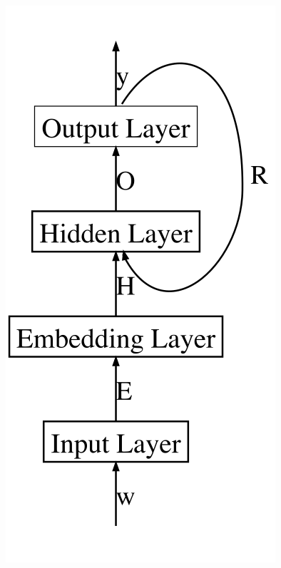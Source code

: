 \documentclass[12pt,a4paper,times,twoside,openright]{report}
\begin{document}
\begin{figure}[ht!]
\begin{minipage}{0.325\linewidth}
    \includegraphics[scale=0.4]{images/NN/LD-RNN/JordanRNN_inkscape}
    \end{minipage}
    \begin{minipage}{0.325\linewidth}
    \centering

\end{minipage}
\end{figure}
\end{document}
